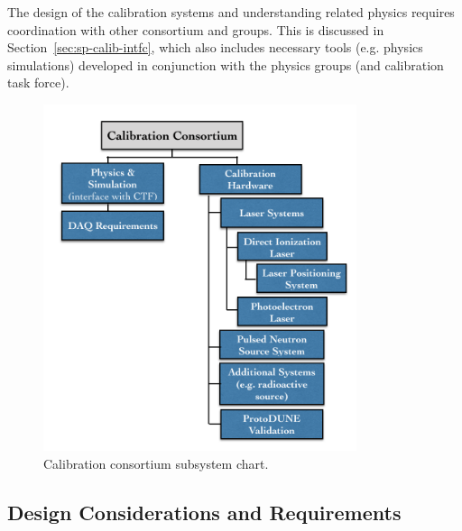 The design of the calibration systems and understanding related physics requires coordination with other consortium and groups. This is discussed in Section~\ref{sec:sp-calib-intfc}, which also includes necessary tools (e.g. physics simulations) developed in conjunction with the physics groups (and calibration task force).

\begin{figure}[tbp]
\centering
\includegraphics[height=4.0in]{graphics/calib_scope_chart.png}
\caption{Calibration consortium subsystem chart.}
\label{fig:scope_chart}
\end{figure}


%


\subsection{Design Considerations and Requirements}
\label{sec:sp-calib-ov-consid}

